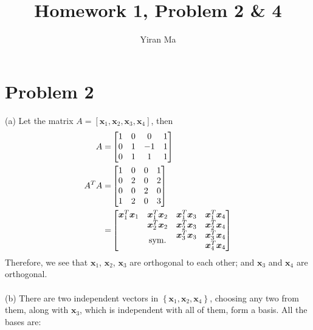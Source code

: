 \documentclass[12pt]{article}
\title{Homework 1, Problem 2 \& 4}
\author{Yiran Ma}
\date{}
\begin{document}
\maketitle

\section{Problem 2}
(a) Let the matrix $ A= \left[   \boldsymbol{x}_{1}, \boldsymbol{x}_{2}, \boldsymbol{x}_{3}, \boldsymbol{x}_{4}    \right] $, then \\
\begin{eqnarray*}
A =& \begin{bmatrix}
1&  0&  0&    1\\
0&  1&  -1&   1\\
0&  1&   1&    1\\
\end{bmatrix} \\
A^{T}A =& \begin{bmatrix}
1&  0&  0&    1\\
0&  2&  0&    2\\
0&  0&   2&    0\\
1&  2&   0&    3\\
\end{bmatrix} \\
=&\begin{bmatrix}
\boldsymbol{x}_{1}^{T}\boldsymbol{x}_{1}&  \boldsymbol{x}_{1}^{T}\boldsymbol{x}_{2}&    \boldsymbol{x}_{1}^{T}\boldsymbol{x}_{3}&      \boldsymbol{x}_{1}^{T}\boldsymbol{x}_{4} \\  
 &       \boldsymbol{x}_{2}^{T}\boldsymbol{x}_{2}&       \boldsymbol{x}_{2}^{T}\boldsymbol{x}_{3}&        \boldsymbol{x}_{2}^{T}\boldsymbol{x}_{4}     \\
 &  \multirow{2}{*}{\makebox[0pt]{\text{sym.}}}        &          \boldsymbol{x}_{3}^{T}\boldsymbol{x}_{3}&         \boldsymbol{x}_{3}^{T}\boldsymbol{x}_{4}     \\
 &         &         &     \boldsymbol{x}_{4}^{T}\boldsymbol{x}_{4}\\       
\end{bmatrix}
\end{eqnarray*}
Therefore, we see that $\boldsymbol{x}_{1}$, $\boldsymbol{x}_{2}$, $\boldsymbol{x}_{3}$ are orthogonal to each other; and $\boldsymbol{x}_{3}$ and $\boldsymbol{x}_{4}$ are orthogonal.\\
\\
(b) There are two independent vectors in $\left \{ \boldsymbol{x}_{1}, \boldsymbol{x}_{2}, \boldsymbol{x}_{4}  \right \}$, choosing any two from them, along with $\boldsymbol{x}_{3}$, which is independent with all of them, form a basis. All the bases are:
\end{document}
